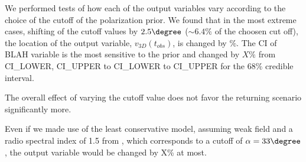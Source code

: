\label{sec: sensitivityTests}
We performed tests of how each of the output variables vary according to the
choice of the cutoff of the polarization prior.
We found that in the most extreme cases, shifting of the cutoff values by
$2.5\degree$ ($\sim 6.4\%$ of the choosen cut off), the location of the output
variable, $v_{3D}(t_{obs})$, is changed by $\%$. The CI of BLAH variable is
the most sensitive to the prior and changed by $X\%$ from CI_LOWER, CI_UPPER to
CI_LOWER to CI_UPPER for the $68\%$ credible interval. 

The overall effect of varying the cutoff value does not favor the
returning scenario significantly more. 

Even if we made use of the least conservative model, assuming weak field
and a radio spectral index of 1.5 from \cite{E98}, which
corresponds to a cutoff of $\alpha = 33\degree$, the output variable would
be changed by X\% at most. 





